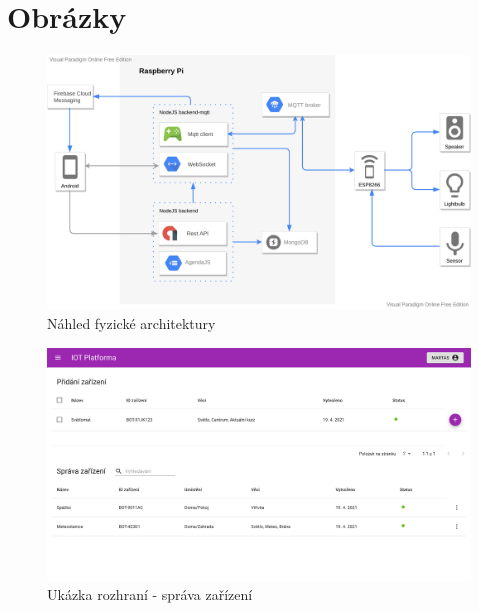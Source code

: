 \documentclass[thesis=B,czech]{FITthesis}[2019/12/23]
\begin{document}
\chapter{Obrázky}
\begin{figure}[htbp]
    \centering
    \includegraphics[width=\textwidth]{img/architecture.pdf}
    \caption{Náhled fyzické architektury}
\end{figure}

\begin{figure}[htbp]
    \centering
    \includegraphics[width=\textwidth]{img/screens/deviceManagement2.png}
    \caption{Ukázka rozhraní - správa zařízení}
\end{figure}
\end{document}
